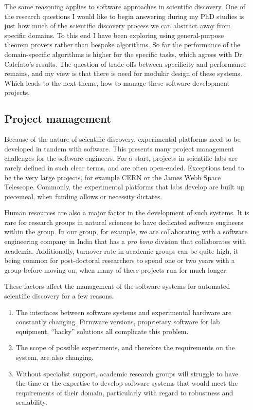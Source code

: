 \documentclass[11pt]{article}
\begin{document}
The same reasoning applies to software approaches in scientific discovery. One of the research questions I would like to begin answering during my PhD studies is just how much of the scientific discovery process we can abstract away from specific domains. To this end I have been exploring using general-purpose theorem provers rather than bespoke algorithms. So far the performance of the domain-specific algorithms is higher for the specific tasks, which agrees with Dr. Calefato's results. The question of trade-offs between specificity and performance remains, and my view is that there is need for modular design of these systems. Which leads to the next theme, how to manage these software development projects.

\subsection{Project management}

Because of the nature of scientific discovery, experimental platforms need to be developed in tandem with software. This presents many project management challenges for the software engineers. For a start, projects in scientific labs are rarely defined in such clear terms, and are often open-ended. Exceptions tend to be the very large projects, for example CERN or the James Webb Space Telescope. Commonly, the experimental platforms that labs develop are built up piecemeal, when funding allows or necessity dictates.

Human resources are also a major factor in the development of such systems. It is rare for research groups in natural sciences to have dedicated software engineers within the group. In our group, for example, we are collaborating with a software engineering company in India that has a \textit{pro bono} division that collaborates with academia. Additionally, turnover rate in academic groups can be quite high, it being common for post-doctoral researchers to spend one or two years with a group before moving on, when many of these projects run for much longer.

These factors affect the management of the software systems for automated scientific discovery for a few reasons.

\begin{enumerate}
    \item The interfaces between software systems and experimental hardware are constantly changing. Firmware versions, proprietary software for lab equipment, ``hacky'' solutions all complicate this problem.
    \item The scope of possible experiments, and therefore the requirements on the system, are also changing.
    \item Without specialist support, academic research groups will struggle to have the time or the expertise to develop software systems that would meet the requirements of their domain, particularly with regard to robustness and scalability.
\end{enumerate}
\end{document}
